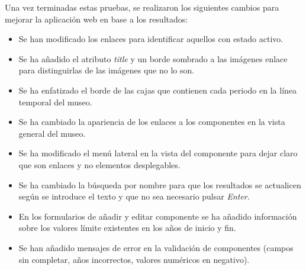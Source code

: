Una vez terminadas estas pruebas, se realizaron los siguientes cambios para mejorar la aplicación web en base a los resultados:
\begin{itemize}
\item Se han modificado los enlaces para identificar aquellos con estado activo.
\item Se ha añadido el atributo \textit{title} y un borde sombrado a las imágenes enlace para distinguirlas de las imágenes que no lo son.
\item Se ha enfatizado el borde de las cajas que contienen cada periodo en la línea temporal del museo.
\item Se ha cambiado la apariencia de los enlaces a los componentes en la vista general del museo.
\item Se ha modificado el menú lateral en la vista del componente para dejar claro que son enlaces y no elementos desplegables.
\item Se ha cambiado la búsqueda por nombre para que los resultados se actualicen según se introduce el texto y que no sea necesario pulsar \textit{Enter}.
\item En los formularios de añadir y editar componente se ha añadido información sobre los valores límite existentes en los años de inicio y fin.
\item Se han añadido mensajes de error en la validación de componentes (campos sin completar, años incorrectos, valores numéricos en negativo).
\end{itemize}